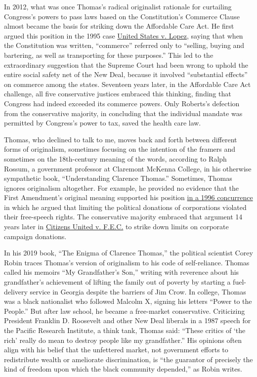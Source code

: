 In 2012, what was once Thomas's radical originalist rationale for
curtailing Congress's powers to pass laws based on the Constitution's
Commerce Clause almost became the basis for striking down the Affordable
Care Act. He first argued this position in the 1995 case
\href{https://www.oyez.org/cases/1994/93-1260}{United States v. Lopez},
saying that when the Constitution was written, ``commerce'' referred
only to ``selling, buying and bartering, as well as transporting for
these purposes.'' This led to the extraordinary suggestion that the
Supreme Court had been wrong to uphold the entire social safety net of
the New Deal, because it involved ``substantial effects'' on commerce
among the states. Seventeen years later, in the Affordable Care Act
challenge, all five conservative justices embraced this thinking,
finding that Congress had indeed exceeded its commerce powers. Only
Roberts's defection from the conservative majority, in concluding that
the individual mandate was permitted by Congress's power to tax, saved
the health care law.

Thomas, who declined to talk to me, moves back and forth between
different forms of originalism, sometimes focusing on the intention of
the framers and sometimes on the 18th-century meaning of the words,
according to Ralph Rossum, a government professor at Claremont McKenna
College, in his otherwise sympathetic book, ``Understanding Clarence
Thomas.'' Sometimes, Thomas ignores originalism altogether. For example,
he provided no evidence that the First Amendment's original meaning
supported his position \href{https://www.oyez.org/cases/1995/95-489}{in
a 1996 concurrence} in which he argued that limiting the political
donations of corporations violated their free-speech rights. The
conservative majority embraced that argument 14 years later in
\href{https://www.oyez.org/cases/2008/08-205}{Citizens United v. F.E.C.}
to strike down limits on corporate campaign donations.

In his 2019 book, ``The Enigma of Clarence Thomas,'' the political
scientist Corey Robin traces Thomas's version of originalism to his code
of self-reliance. Thomas called his memoirs ``My Grandfather's Son,''
writing with reverence about his grandfather's achievement of lifting
the family out of poverty by starting a fuel-delivery service in Georgia
despite the barriers of Jim Crow. In college, Thomas was a black
nationalist who followed Malcolm X, signing his letters ``Power to the
People.'' But after law school, he became a free-market conservative.
Criticizing President Franklin D. Roosevelt and other New Deal liberals
in a 1987 speech for the Pacific Research Institute, a think tank,
Thomas said: ``These critics of `the rich' really do mean to destroy
people like my grandfather.'' His opinions often align with his belief
that the unfettered market, not government efforts to redistribute
wealth or ameliorate discrimination, is ``the guarantor of precisely the
kind of freedom upon which the black community depended,'' as Robin
writes.

